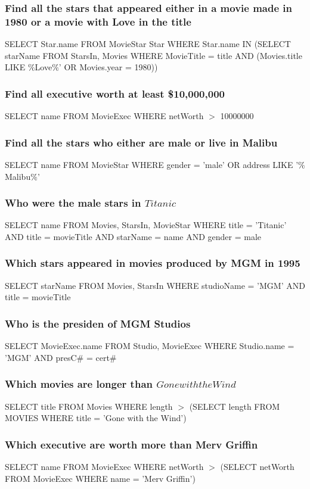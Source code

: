 \documentclass[12pt, a4paper]{article}
\begin{document}
			\subsubsection{Find all the stars that appeared either in a movie made in 1980 or a movie with Love in the title}
				SELECT Star.name FROM MovieStar Star WHERE Star.name IN (SELECT starName FROM StarsIn, Movies WHERE MovieTitle = title AND (Movies.title LIKE $\%$Love$\%$' OR Movies.year = 1980))
			\subsubsection{Find all executive worth at least \$10,000,000}
				SELECT name FROM MovieExec WHERE netWorth $>$ 10000000
			\subsubsection{Find all the stars who either are male or live in Malibu}
				SELECT name FROM MovieStar WHERE gender = 'male' OR address LIKE '$\%$Malibu$\%$'  
			\subsubsection{Who were the male stars in $Titanic$}
				SELECT name FROM Movies, StarsIn, MovieStar WHERE title = 'Titanic' AND title = movieTitle AND starName = name AND gender = male
			\subsubsection{Which stars appeared in movies produced by MGM in 1995}
				SELECT starName FROM Movies, StarsIn WHERE studioName = 'MGM' AND title = movieTitle
			\subsubsection{Who is the presiden of MGM Studios}
				SELECT MovieExec.name FROM Studio, MovieExec WHERE Studio.name = 'MGM' AND presC$\#$ = cert$\#$
			\subsubsection{Which movies are longer than $Gone with the Wind$}
				SELECT title FROM Movies WHERE length $>$ (SELECT length FROM MOVIES WHERE title = 'Gone with the Wind')
			\subsubsection{Which executive are worth more than Merv Griffin}
				SELECT name FROM MovieExec WHERE netWorth $>$ (SELECT netWorth FROM MovieExec WHERE name = 'Merv Griffin')
\end{document}
